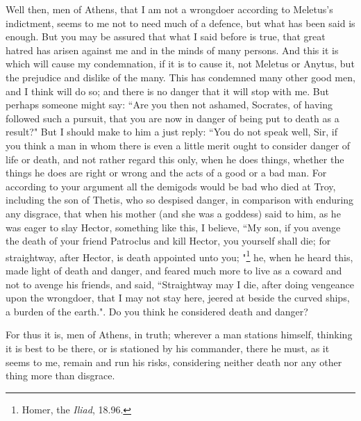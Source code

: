 \documentclass[letterpaper,12pt]{article}
\newcommand{\stephpag}[1]{\marginnote{\small\itshape\fontfamily{ppl}\selectfont #1}}
\begin{document}
Well then, men of Athens, that I am not a wrongdoer according to Meletus's indictment, seems to me not to need much of a defence, but what has been said is enough. But you may be assured that what I said before is true, that great hatred has arisen against me and in the minds of many persons. And this it is which will cause my condemnation, if it is to cause it, not Meletus or Anytus, but the prejudice and dislike of the many. This has condemned many other good men, and I think will do so; \stephpag{b} and there is no danger that it will stop with me. But perhaps someone might say: ``Are you then not ashamed, Socrates, of having followed such a pursuit, that you are now in danger of being put to death as a result?" But I should make to him a just reply: ``You do not speak well, Sir, if you think a man in whom there is even a little merit ought to consider danger of life or death, and not rather regard this only, when he does things, whether the things he does are right or wrong and the acts of a good or a bad man. For according to your argument all the demigods \stephpag{c} would be bad who died at Troy, including the son of Thetis, who so despised danger, in comparison with enduring any disgrace, that when his mother (and she was a goddess) said to him, as he was eager to slay Hector, something like this, I believe, ``My son, if you avenge the death of your friend Patroclus and kill Hector, you yourself shall die;
for straightway, after Hector, is death appointed unto you;
"\footnote{Homer, the \emph{Iliad}, 18.96.} he, when he heard this, made light of death and danger, \stephpag{d} and feared much more to live as a coward and not to avenge his friends, and said, ``Straightway may I die, after doing vengeance upon the wrongdoer, that I may not stay here, jeered at beside the curved ships, a burden of the earth.". Do you think he considered death and danger?

For thus it is, men of Athens, in truth; wherever a man stations himself, thinking it is best to be there, or is stationed by his commander, there he must, as it seems to me, remain and run his risks, considering neither death nor any other thing more than disgrace.
\end{document}
